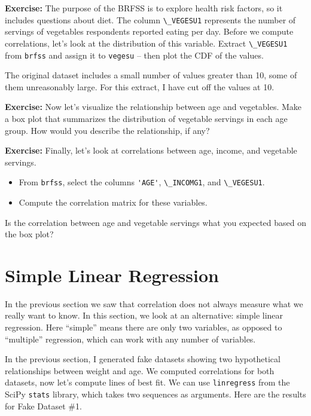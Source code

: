 \textbf{Exercise:} The purpose of the BRFSS is to explore health risk
factors, so it includes questions about diet. The column
\passthrough{\lstinline!\_VEGESU1!} represents the number of servings of
vegetables respondents reported eating per day. Before we compute
correlations, let's look at the distribution of this variable. Extract
\passthrough{\lstinline!\_VEGESU1!} from \passthrough{\lstinline!brfss!}
and assign it to \passthrough{\lstinline!vegesu!} -- then plot the CDF
of the values.

The original dataset includes a small number of values greater than 10,
some of them unreasonably large. For this extract, I have cut off the
values at 10.

\textbf{Exercise:} Now let's visualize the relationship between age and
vegetables. Make a box plot that summarizes the distribution of
vegetable servings in each age group. How would you describe the
relationship, if any?

\textbf{Exercise:} Finally, let's look at correlations between age,
income, and vegetable servings.

\begin{itemize}

\item
  From \passthrough{\lstinline!brfss!}, select the columns
  \passthrough{\lstinline!'AGE'!}, \passthrough{\lstinline!\_INCOMG1!},
  and \passthrough{\lstinline!\_VEGESU1!}.
\item
  Compute the correlation matrix for these variables.
\end{itemize}

Is the correlation between age and vegetable servings what you expected
based on the box plot?

\section{Simple Linear Regression}\label{simple-linear-regression}

In the previous section we saw that correlation does not always measure
what we really want to know. In this section, we look at an alternative:
simple linear regression. Here ``simple'' means there are only two
variables, as opposed to ``multiple'' regression, which can work with
any number of variables.

In the previous section, I generated fake datasets showing two
hypothetical relationships between weight and age. We computed
correlations for both datasets, now let's compute lines of best fit. We
can use \passthrough{\lstinline!linregress!} from the SciPy
\passthrough{\lstinline!stats!} library, which takes two sequences as
arguments. Here are the results for Fake Dataset \#1.

